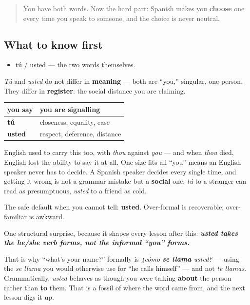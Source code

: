 \label{lesson:ES-C03-tu-usted-register}



\begin{quote}
You have both words. Now the hard part: Spanish makes you \textbf{choose} one every time you speak to someone, and the choice is never neutral.
\end{quote}

\subsection*{What to know first}
\begin{itemize}
\raggedright
  \item tú / usted — the two words themselves.
\end{itemize}

\begin{culture}
\emph{Tú} and \emph{usted} do not differ in \textbf{meaning} — both are \textquotedblleft{}you,\textquotedblright{} singular, one person. They differ in \textbf{register}: the social distance you are claiming.

\noindent
\begin{tabularx}{\linewidth}{@{}>{\raggedright\arraybackslash}X>{\raggedright\arraybackslash}X@{}}
\toprule
\textbf{you say} & \textbf{you are signalling} \\
\midrule
\textbf{tú} & closeness, equality, ease \\
\textbf{usted} & respect, deference, distance \\
\bottomrule
\end{tabularx}

English used to carry this too, with \emph{thou} against \emph{you} — and when \emph{thou} died, English lost the ability to say it at all. One-size-fits-all \textquotedblleft{}you\textquotedblright{} means an English speaker never has to decide. A Spanish speaker decides every single time, and getting it wrong is not a grammar mistake but a \textbf{social} one: \emph{tú} to a stranger can read as presumptuous, \emph{usted} to a friend as cold.

The safe default when you cannot tell: \textbf{usted}. Over-formal is recoverable; over-familiar is awkward.
\end{culture}

\begin{grammarlens}[title={Grammar Lens: usted takes he/she forms}]
One structural surprise, because it shapes every lesson after this: \emph{\textbf{usted\emph{ takes the }he/she\emph{ verb forms\textbf{, not the informal \textquotedblleft{}you\textquotedblright{} forms.}}}}

That is why \textquotedblleft{}what's your name?\textquotedblright{} formally is \emph{¿cómo \textbf{se llama} usted?} — using the \emph{se llama} you would otherwise use for \textquotedblleft{}he calls himself\textquotedblright{} — and not \emph{te llamas}. Grammatically, \emph{usted} behaves as though you were talking \textbf{about} the person rather than \textbf{to} them. That is a fossil of where the word came from, and the next lesson digs it up.
\end{grammarlens}

